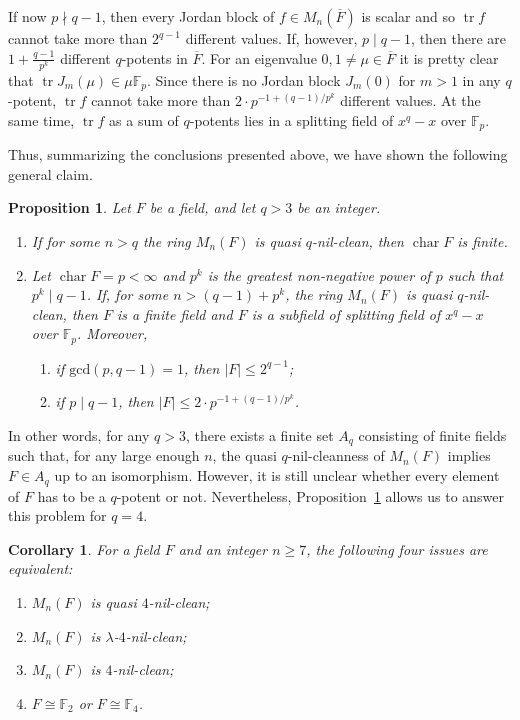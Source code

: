 \documentclass{amsart}
\DeclareMathOperator{\Char}{char}
\DeclareMathOperator{\tr}{tr}
\newtheorem{proposition}[theorem]{Proposition}
\newtheorem{corollary}[theorem]{Corollary}
\theoremstyle{definition}
\theoremstyle{remark}
\numberwithin{equation}{section}
\begin{document}
If now $p \nmid q-1$, then every Jordan block of $f \in M_{n}(\overline{F})$ is scalar and so $\tr f$ cannot take more than $2^{q-1}$ different values. If, however, $p \mid q-1$, then there are $1+\frac{q-1}{p^k}$ different $q$-potents in $\overline{F}$. For an eigenvalue $0,1 \not = \mu \in \overline{F}$ it is pretty clear that $\tr J_{m}(\mu) \in \mu\mathbb{F}_{p}$. Since there is no Jordan block $J_{m}(0)$ for $m>1$ in any $q$-potent, $\tr f$ cannot take more than $2 \cdot p^{-1 + (q-1)/p^k}$ different values. At the same time, $\tr f$ as a sum of $q$-potents lies in a splitting field of $x^q-x$ over $\mathbb{F}_{p}$.

\medskip

Thus, summarizing the conclusions presented above, we have shown the following general claim.

\begin{proposition}
\label{general-case-quasi-q-nil}
Let $F$ be a field, and let $q > 3$ be an integer.
\begin{enumerate}
\item
If for some $n > q$ the ring $M_{n}(F)$ is quasi $q$-nil-clean, then $\Char F$ is finite.

\item Let $\Char F = p < \infty$ and $p^{k}$ is the greatest non-negative power of $p$ such that $p^{k} \mid q-1$. If, for some $n > (q-1) + p^{k}$, the ring $M_{n}(F)$ is quasi $q$-nil-clean, then $F$ is a finite field and $F$ is a subfield of splitting field of $x^q-x$ over $\mathbb{F}_{p}$. Moreover,
\begin{enumerate}
\item if $\mathrm{gcd}(p, q-1) = 1$, then $|F| \leq 2^{q-1}$;
\item if $p \mid q-1$, then $|F| \leq 2 \cdot p^{-1 + (q-1)/p^k}$.
\end{enumerate}
\end{enumerate}
\end{proposition}

In other words, for any $q > 3$, there exists a finite set $A_{q}$ consisting of finite fields such that, for any large enough $n$, the quasi $q$-nil-cleanness of $M_{n}(F)$ implies $F \in A_{q}$ up to an isomorphism. However, it is still unclear whether every element of $F$ has to be a $q$-potent or not. Nevertheless, Proposition~\ref{general-case-quasi-q-nil} allows us to answer this problem for $q=4$.

\begin{corollary}
\label{quasi-4}
For a field $F$ and an integer $n \geq 7$, the following four issues are equivalent:
\begin{enumerate}
\item $M_{n}(F)$ is quasi $4$-nil-clean;
\item $M_{n}(F)$ is $\lambda$-$4$-nil-clean;
\item $M_{n}(F)$ is $4$-nil-clean;
\item $F \cong \mathbb{F}_{2}$ or $F \cong \mathbb{F}_{4}$.
\end{enumerate}
\end{corollary}
\end{document}
